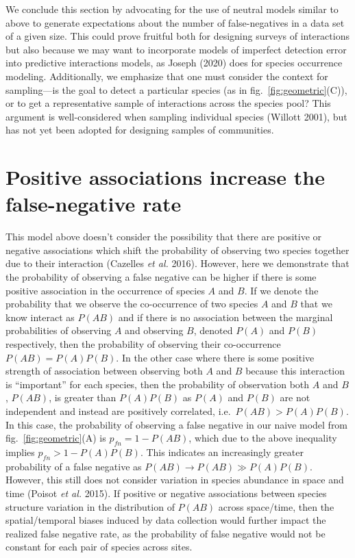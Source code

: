 \documentclass[10pt,oneside]{article}
\begin{document}
We conclude this section by advocating for the use of neutral models
similar to above to generate expectations about the number of
false-negatives in a data set of a given size. This could prove fruitful
both for designing surveys of interactions but also because we may want
to incorporate models of imperfect detection error into predictive
interactions models, as Joseph (2020) does for species occurrence
modeling. Additionally, we emphasize that one must consider the context
for sampling---is the goal to detect a particular species (as in
fig.~\ref{fig:geometric}(C)), or to get a representative sample of
interactions across the species pool? This argument is well-considered
when sampling individual species (Willott 2001), but has not yet been
adopted for designing samples of communities.

\hypertarget{positive-associations-increase-the-false-negative-rate}{%
\section{Positive associations increase the false-negative
rate}\label{positive-associations-increase-the-false-negative-rate}}

This model above doesn't consider the possibility that there are
positive or negative associations which shift the probability of
observing two species together due to their interaction (Cazelles
\emph{et al.} 2016). However, here we demonstrate that the probability
of observing a false negative can be higher if there is some positive
association in the occurrence of species \(A\) and \(B\). If we denote
the probability that we observe the co-occurrence of two species \(A\)
and \(B\) that we know interact as \(P(AB)\) and if there is no
association between the marginal probabilities of observing \(A\) and
observing \(B\), denoted \(P(A)\) and \(P(B)\) respectively, then the
probability of observing their co-occurrence \(P(AB) = P(A)P(B)\). In
the other case where there is some positive strength of association
between observing both \(A\) and \(B\) because this interaction is
``important'' for each species, then the probability of observation both
\(A\) and \(B\), \(P(AB)\), is greater than \(P(A)P(B)\) as \(P(A)\) and
\(P(B)\) are not independent and instead are positively correlated,
i.e.~\(P(AB)> P(A)P(B)\). In this case, the probability of observing a
false negative in our naive model from fig.~\ref{fig:geometric}(A) is
\(p_{fn}= 1-P(AB)\), which due to the above inequality implies
\(p_{fn} >1-P(A)P(B)\). This indicates an increasingly greater
probability of a false negative as \(P(AB) \to P(AB) \gg P(A)P(B)\).
However, this still does not consider variation in species abundance in
space and time (Poisot \emph{et al.} 2015). If positive or negative
associations between species structure variation in the distribution of
\(P(AB)\) across space/time, then the spatial/temporal biases induced by
data collection would further impact the realized false negative rate,
as the probability of false negative would not be constant for each pair
of species across sites.
\end{document}
